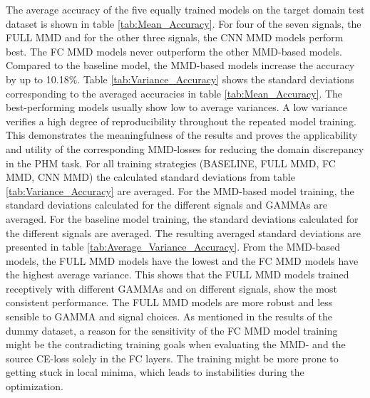 The average accuracy of the five equally trained models on the target domain test dataset is shown in table \ref{tab:Mean_Accuracy}. For four of the seven signals, the FULL MMD and for the other three signals, the CNN MMD models perform best. The FC MMD models never outperform the other MMD-based models. Compared to the baseline model, the MMD-based models increase the accuracy by up to 10.18$\%$. Table \ref{tab:Variance_Accuracy} shows the standard deviations corresponding to the averaged accuracies in table \ref{tab:Mean_Accuracy}. The best-performing models usually show low to average variances. A low variance verifies a high degree of reproducibility throughout the repeated model training. This demonstrates the meaningfulness of the results and proves the applicability and utility of the corresponding MMD-losses for reducing the domain discrepancy in the PHM task. For all training strategies (BASELINE, FULL MMD, FC MMD, CNN MMD) the calculated standard deviations from table \ref{tab:Variance_Accuracy} are averaged. For the MMD-based model training, the standard deviations calculated for the different signals and GAMMAs are averaged. For the baseline model training, the standard deviations calculated for the different signals are averaged. The resulting averaged standard deviations are presented in table \ref{tab:Average_Variance_Accuracy}. From the MMD-based models, the FULL MMD models have the lowest and the FC MMD models have the highest average variance. This shows that the FULL MMD models trained receptively with different GAMMAs and on different signals, show the most consistent performance. The FULL MMD models are more robust and less sensible to GAMMA and signal choices. As mentioned in the results of the dummy dataset, a reason for the sensitivity of the FC MMD model training might be the contradicting training goals when evaluating the MMD- and the source CE-loss solely in the FC layers. The training might be more prone to getting stuck in local minima, which leads to instabilities during the optimization.
